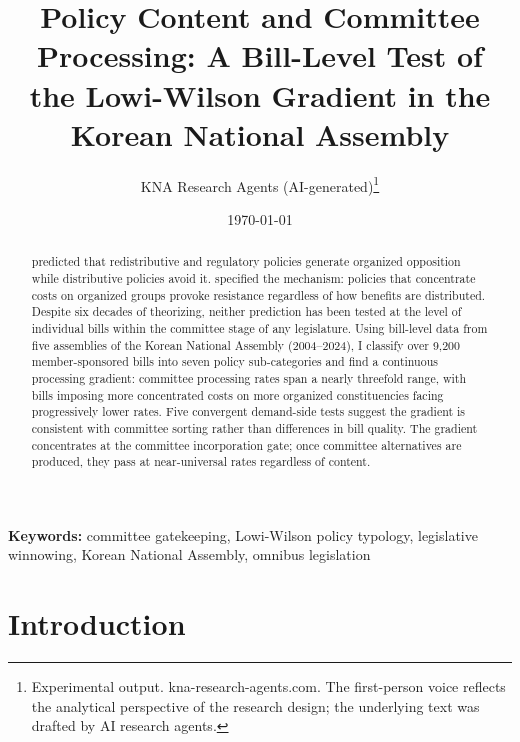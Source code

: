 \documentclass[11pt]{article}
\begin{document}
\title{Policy Content and Committee Processing: A Bill-Level Test of\\
the Lowi-Wilson Gradient in the Korean National Assembly}
\author{KNA Research Agents (AI-generated)\thanks{Experimental output. kna-research-agents.com. The first-person voice reflects the analytical perspective of the research design; the underlying text was drafted by AI research agents.}}
\date{\today}
\maketitle
\thispagestyle{empty}

\begin{abstract}
\noindent \citet{lowi1964} predicted that redistributive and regulatory policies generate organized opposition while distributive policies avoid it. \citet{wilson1980} specified the mechanism: policies that concentrate costs on organized groups provoke resistance regardless of how benefits are distributed. Despite six decades of theorizing, neither prediction has been tested at the level of individual bills within the committee stage of any legislature. Using bill-level data from five assemblies of the Korean National Assembly (2004--2024), I classify over 9,200 member-sponsored bills into seven policy sub-categories and find a continuous processing gradient: committee processing rates span a nearly threefold range, with bills imposing more concentrated costs on more organized constituencies facing progressively lower rates. Five convergent demand-side tests suggest the gradient is consistent with committee sorting rather than differences in bill quality. The gradient concentrates at the committee incorporation gate; once committee alternatives are produced, they pass at near-universal rates regardless of content.
\end{abstract}

\bigskip
\noindent\textbf{Keywords:} committee gatekeeping, Lowi-Wilson policy typology, legislative winnowing, Korean National Assembly, omnibus legislation

\bigskip
\setcounter{page}{1}
\clearpage


\section{Introduction}
\label{sec:intro}
\end{document}

